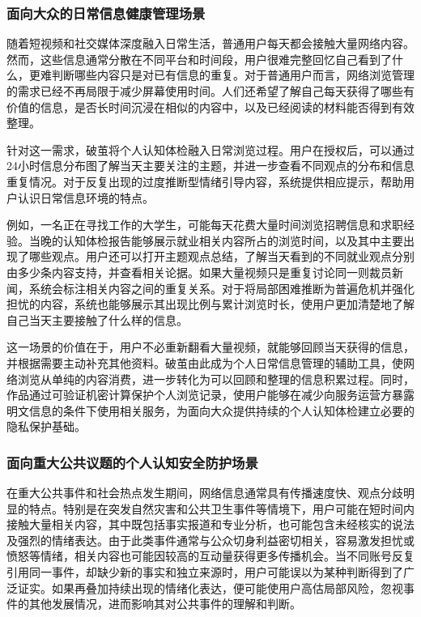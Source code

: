 \subsubsection{面向大众的日常信息健康管理场景}\label{section:1.5.1}

随着短视频和社交媒体深度融入日常生活，普通用户每天都会接触大量网络内容。然而，这些信息通常分散在不同平台和时间段，用户很难完整回忆自己看到了什么，更难判断哪些内容只是对已有信息的重复。对于普通用户而言，网络浏览管理的需求已经不再局限于减少屏幕使用时间。人们还希望了解自己每天获得了哪些有价值的信息，是否长时间沉浸在相似的内容中，以及已经阅读的材料能否得到有效整理。

针对这一需求，破茧将个人认知体检融入日常浏览过程。用户在授权后，可以通过24小时信息分布图了解当天主要关注的主题，并进一步查看不同观点的分布和信息重复情况。对于反复出现的过度推断型情绪引导内容，系统提供相应提示，帮助用户认识日常信息环境的特点。

例如，一名正在寻找工作的大学生，可能每天花费大量时间浏览招聘信息和求职经验。当晚的认知体检报告能够展示就业相关内容所占的浏览时间，以及其中主要出现了哪些观点。用户还可以打开主题观点总结，了解当天看到的不同就业观点分别由多少条内容支持，并查看相关论据。如果大量视频只是重复讨论同一则裁员新闻，系统会标注相关内容之间的重复关系。对于将局部困难推断为普遍危机并强化担忧的内容，系统也能够展示其出现比例与累计浏览时长，使用户更加清楚地了解自己当天主要接触了什么样的信息。

这一场景的价值在于，用户不必重新翻看大量视频，就能够回顾当天获得的信息，并根据需要主动补充其他资料。破茧由此成为个人日常信息管理的辅助工具，使网络浏览从单纯的内容消费，进一步转化为可以回顾和整理的信息积累过程。同时，作品通过可验证机密计算保护个人浏览记录，使用户能够在减少向服务运营方暴露明文信息的条件下使用相关服务，为面向大众提供持续的个人认知体检建立必要的隐私保护基础。

\subsubsection{面向重大公共议题的个人认知安全防护场景}\label{section:1.5.2}

在重大公共事件和社会热点发生期间，网络信息通常具有传播速度快、观点分歧明显的特点。特别是在突发自然灾害和公共卫生事件等情境下，用户可能在短时间内接触大量相关内容，其中既包括事实报道和专业分析，也可能包含未经核实的说法及强烈的情绪表达。由于此类事件通常与公众切身利益密切相关，容易激发担忧或愤怒等情绪，相关内容也可能因较高的互动量获得更多传播机会。当不同账号反复引用同一事件，却缺少新的事实和独立来源时，用户可能误以为某种判断得到了广泛证实。如果再叠加持续出现的情绪化表达，便可能使用户高估局部风险，忽视事件的其他发展情况，进而影响其对公共事件的理解和判断。

